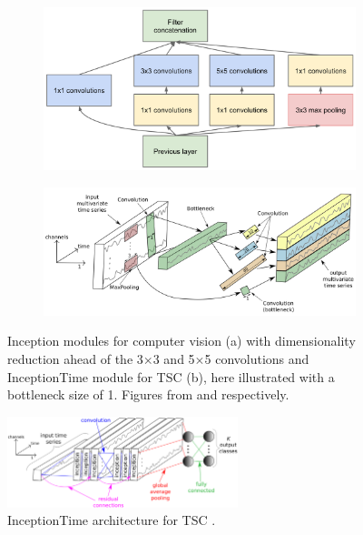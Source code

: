 \begin{figure}
  \centering
  \begin{subfigure}[c]{0.6\textwidth}
    \includegraphics[width=\textwidth]{files/figs/inception-module-dimred.png}
    \caption{}
    \label{fig:inception-module}
  \end{subfigure}
  \begin{subfigure}[c]{0.6\textwidth}
    \includegraphics[width=\textwidth]{files/figs/inception-time-module.png}
    \caption{}
    \label{fig:inceptiontime-module}
  \end{subfigure}
  \caption{Inception modules for computer vision (a) with dimensionality reduction ahead of the 3$\times$3 and 5$\times$5 convolutions and InceptionTime module for TSC (b), here illustrated with a bottleneck size of 1. Figures from \cite{Szegedy2015} and \cite{IsmailFawaz2020} respectively.}
\end{figure}

\begin{figure}
  \centering
  \includegraphics[width=0.6\textwidth]{files/figs/inceptiontime.png}
  \caption{InceptionTime architecture for TSC \cite{IsmailFawaz2020}.}
  \label{fig:inceptiontime}
\end{figure}

